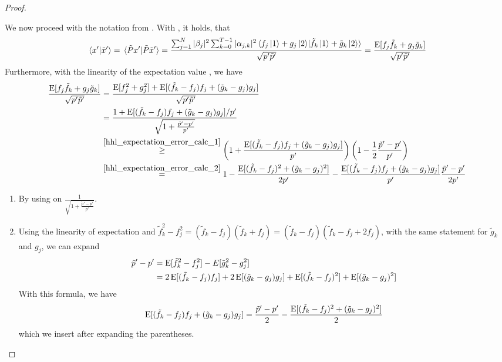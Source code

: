 \begin{proof}
\begin{enumerate}[label=(\roman*), wide]
        We now proceed with the notation from . With , it holds, that
        \begin{align}
            \braket*{x'}{\tilde{x}'} = \braket*{\tilde{P} x'}{\tilde{P} \tilde{x}'} = \frac{\sum_{j = 1}^N |\beta_j|^2 \sum_{k=0}^{T-1} |\alpha_{j, k}|^2 \braket*{f_j\ket{1}+g_j\ket{2}}{\tilde{f}_k \ket{1}+\tilde{g}_k\ket{2}}}{\sqrt{p'\tilde{p}'}} = \frac{\operatorname{E}[f_j\tilde{f}_k+g_j\tilde{g}_k]}{\sqrt{p'\tilde{p}'}}
        \end{align}
        Furthermore, with the linearity of the expectation value \cite[p. 21]{Aigner2006}, we have
        \begin{align}
            \frac{\operatorname{E}[f_j\tilde{f}_k+g_j\tilde{g}_k]}{\sqrt{p'\tilde{p}'}} &= \frac{\operatorname{E}[f_j^2+g_j^2]+\operatorname{E}[(\tilde{f}_k-f_j)f_j+(\tilde{g}_k-g_j)g_j]}{\sqrt{p'\tilde{p}'}}\\
            &= \frac{1 + \operatorname{E}[(\tilde{f}_k-f_j)f_j+(\tilde{g}_k-g_j)g_j]/p'}{\sqrt{1+\frac{\tilde{p}'-p'}{p'}}}\\
            &\overset{\ref{hhl_expectation_error_calc_1}}{\geq} \left(1 + \frac{\operatorname{E}[(\tilde{f}_k-f_j)f_j+(\tilde{g}_k-g_j)g_j]}{p'}\right)\left(1-\frac{1}{2}\frac{\tilde{p}'-p'}{p'}\right)\\
            &\overset{\ref{hhl_expectation_error_calc_2}}{=} 1 - \frac{\operatorname{E}[(\tilde{f}_k-f_j)^2+(\tilde{g}_k-g_j)^2]}{2p'} - \frac{\operatorname{E}[(\tilde{f}_k-f_j)f_j+(\tilde{g}_k-g_j)g_j]}{p'}\frac{\tilde{p}'-p'}{2p'}
        \end{align}
        \begin{enumerate}[label=(\arabic*)]
            \item \label{hhl_expectation_error_calc_1} By using  on \(\frac{1}{\sqrt{1+\frac{\tilde{p}'-p'}{p'}}}\).
            \item \label{hhl_expectation_error_calc_2} Using the linearity of expectation and \(\tilde{f}_k^2-f_j^2 = (\tilde{f}_k-f_j)(\tilde{f}_k+f_j) = (\tilde{f}_k-f_j)(\tilde{f}_k-f_j+2f_j)\), with the same statement for \(\tilde{g}_k\) and \(g_j\), we can expand
            \begin{align}
                \tilde{p}'-p' &= \operatorname{E}[\tilde{f}_k^2-f_j^2] - E[\tilde{g}_k^2-g_j^2]\\
                &= 2\operatorname{E}[(\tilde{f}_k-f_j)f_j]+2\operatorname{E}[(\tilde{g}_k-g_j)g_j]+\operatorname{E}[(\tilde{f}_k-f_j)^2]+\operatorname{E}[(\tilde{g}_k-g_j)^2]
            \end{align}
            With this formula, we have
            \begin{align}
                \operatorname{E}[(\tilde{f}_k-f_j)f_j+(\tilde{g}_k-g_j)g_j] = \frac{\tilde{p}'-p'}{2} - \frac{\operatorname{E}[(\tilde{f}_k-f_j)^2+(\tilde{g}_k-g_j)^2]}{2}
            \end{align}
            which we insert after expanding the parentheses.
        \end{enumerate}


\end{enumerate}
\end{proof}
